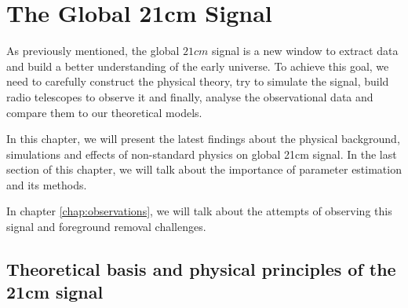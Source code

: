\documentclass[12pt, TexShade, letterpaper]{report}
\begin{document}
\chapter{The Global 21cm Signal}
\label{chap:global21cm}
As previously mentioned, the global $21cm$ signal is a new window to extract data and build a better understanding of the early universe. To achieve this goal, we need to carefully construct the physical theory, try to simulate the signal, build radio telescopes to observe it and finally, analyse the observational data and compare them to our theoretical models.\par
In this chapter, we will present the latest findings about the physical background, simulations and effects of non-standard physics on global 21cm signal. In the last section of this chapter, we will talk about the importance of parameter estimation and its methods.\par
In chapter \ref{chap:observations}, we will talk about the attempts of observing this signal and foreground removal challenges.\par
\section{Theoretical basis and physical principles of the 21cm signal}
\end{document}
